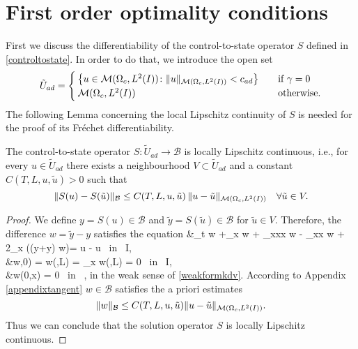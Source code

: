\section{First order optimality conditions}
\label{secoptconditions}
First we discuss the differentiability of the control-to-state operator $S$ defined in \eqref{controltostate}. {\color{red}In order to do that, we introduce the open set
$$\tilde U_{ad} = \begin{cases} \left\{u \in \mathcal{M}(\Omega_c, L^{2}(I))\colon \lVert u\rVert_{\mathcal{M}(\Omega_c, L^{2}(I))}< c_{ad} \right\} &\quad\mbox{if } \gamma = 0 \\
\mathcal{M}(\Omega_c, L^{2}(I)) & \quad \mbox{otherwise.}
 \end{cases}$$}
The following Lemma concerning the local Lipschitz continuity of $S$ is needed for the proof of its Fr\'echet differentiability.
\begin{lemma}
The control-to-state operator $S\colon \tilde U_{ad}\rightarrow \mathcal B$ is locally Lipschitz continuous, i.e., for every $u\in \tilde U_{ad}$ there exists a neighbourhood $V\subset \tilde U_{ad}$ and a constant
$C(T,L,u,\tilde u)>0$ such that
\[\|S(u)-S(\tilde u)\|_{\mathcal B}\leq C(T,L,u,\tilde u)\,\|u-\tilde u\|_{\mathcal{M}(\Omega_c, L^{2}(I))}\quad \forall \tilde u\in V.\]
 \label{lipschitzcontinuity}
\end{lemma}
\begin{proof}
We define $y = S(u) \in \mathcal{B}$ and $\tilde{y} = S(\tilde u) \in \mathcal{B}$ for $\tilde u\in V$. Therefore, the difference $w = \tilde{y} - y$ satisfies the equation
\bean
&\partial_t w +\partial_x w + \partial_{xxx} w - \gamma \partial_{xx} w  +  2\partial_x ((y+\tilde y) w)= \tilde u - u \mbox{ in } I\times\Omega,\\
&w\cdot,0) = w(\cdot,L) = \partial_x w(\cdot,L) = 0 \mbox{ in } I,\\
&w(0,x) = 0 \mbox{ in } \Omega,
\eean
in the weak sense of \eqref{weakformkdv}. According to Appendix \ref{appendixtangent} $w \in \mathcal{B}$ satisfies the a priori estimates
\[
\lVert w\rVert_{\mathcal{B}} \leq C(T,L,u,\tilde u)\lVert u-\tilde u\rVert_{\mathcal{M}(\Omega_c, L^{2}(I))}.
\]
Thus we can conclude that the solution operator $S$ is locally Lipschitz continuous.
\qquad\end{proof}

